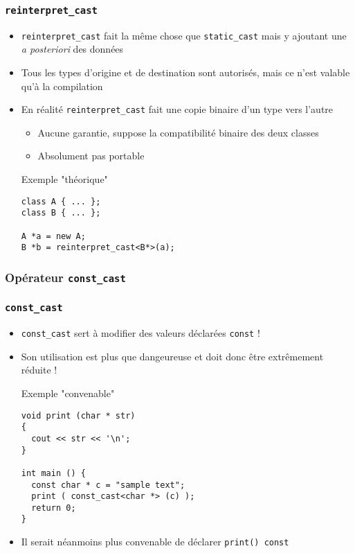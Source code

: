 \begin{frame}[fragile]
\frametitle{\texttt{reinterpret\_cast}}
\begin{itemize}
\item \verb|reinterpret_cast| fait la même chose que \verb|static_cast| mais y ajoutant une  \textit{a posteriori} des données
\item Tous les types d'origine et de destination sont autorisés, mais ce n'est valable qu'à la compilation
\item En réalité \verb|reinterpret_cast| fait une copie binaire d'un type vers l'autre
\begin{itemize}
\item Aucune garantie, suppose la compatibilité binaire des deux classes
\item Absolument pas portable
\end{itemize}
\begin{codeblock}{Exemple "théorique"}
\begin{lstlisting}
class A { ... };
class B { ... };

A *a = new A;
B *b = reinterpret_cast<B*>(a);
\end{lstlisting}
\end{codeblock}
\end{itemize}
\end{frame}

\subsubsection{Opérateur \texttt{const\_cast}}

\begin{frame}[fragile]
\frametitle{\texttt{const\_cast}}
\begin{itemize}
\item \verb|const_cast| sert à modifier des valeurs déclarées \verb|const| !
\item Son utilisation est \alert{plus que dangeureuse} et doit donc être extrêmement réduite !
\begin{codeblock}{Exemple "convenable"}
\begin{lstlisting}
void print (char * str)
{
  cout << str << '\n';
}

int main () {
  const char * c = "sample text";
  print ( const_cast<char *> (c) );
  return 0;
}
\end{lstlisting}
\end{codeblock}
\pause \item Il serait néanmoins plus convenable de déclarer \verb|print() const|
\end{itemize}
\end{frame}

